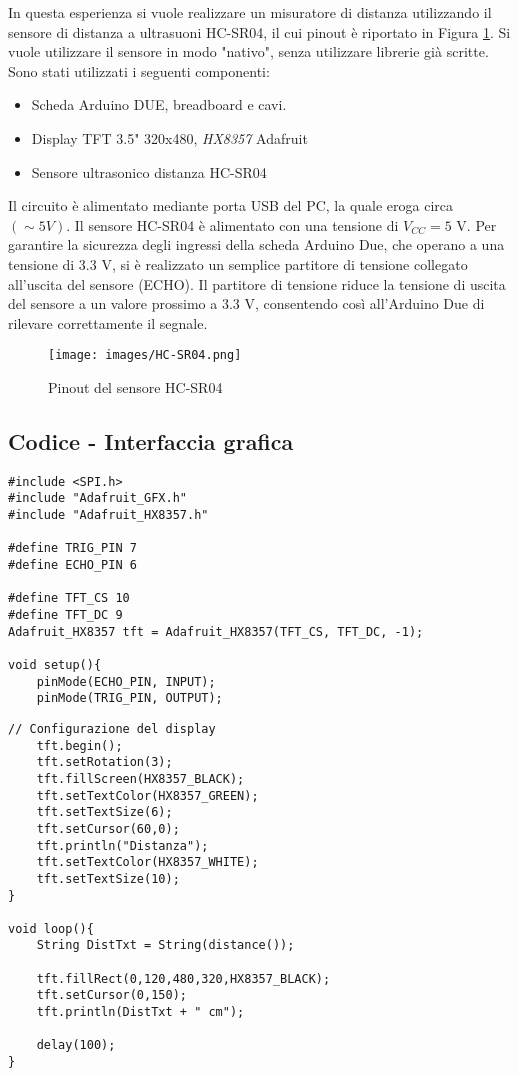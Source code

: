 In questa esperienza si vuole realizzare un misuratore di distanza utilizzando il sensore di distanza a ultrasuoni HC-SR04, il cui pinout è riportato in Figura \ref{fig:HC-SR04}. Si vuole utilizzare il sensore in modo "nativo", senza utilizzare librerie già scritte. Sono stati utilizzati i seguenti componenti:
\begin{itemize}
    \item Scheda Arduino DUE, breadboard e cavi.
    \item Display TFT 3.5" 320x480, \textit{HX8357} Adafruit
    \item Sensore ultrasonico distanza HC-SR04
\end{itemize}
Il circuito è alimentato mediante porta USB del PC, la quale eroga circa $(\sim 5 V)$. Il sensore HC-SR04 è alimentato con una tensione di $V_{CC}=5$ V. Per garantire la sicurezza degli ingressi della scheda Arduino Due, che operano a una tensione di 3.3 V, si è realizzato un semplice partitore di tensione collegato all'uscita del sensore (ECHO). Il partitore di tensione riduce la tensione di uscita del sensore a un valore prossimo a 3.3 V, consentendo così all'Arduino Due di rilevare correttamente il segnale.
\begin{figure}[H]
    \centering
    \texttt{[image: images/HC-SR04.png]}
    \caption{Pinout del sensore HC-SR04}
    \label{fig:HC-SR04}
\end{figure}
\subsection{Codice - Interfaccia grafica}
\begin{lstlisting}[frame=single, language=Arduino]
#include <SPI.h>
#include "Adafruit_GFX.h"
#include "Adafruit_HX8357.h"

#define TRIG_PIN 7
#define ECHO_PIN 6

#define TFT_CS 10
#define TFT_DC 9
Adafruit_HX8357 tft = Adafruit_HX8357(TFT_CS, TFT_DC, -1); 

void setup(){
    pinMode(ECHO_PIN, INPUT);
    pinMode(TRIG_PIN, OUTPUT);
\end{lstlisting}
\begin{lstlisting}[frame=single, language=Arduino]
    // Configurazione del display
    tft.begin();
    tft.setRotation(3);
    tft.fillScreen(HX8357_BLACK);
    tft.setTextColor(HX8357_GREEN);
    tft.setTextSize(6);
    tft.setCursor(60,0);
    tft.println("Distanza");
    tft.setTextColor(HX8357_WHITE);
    tft.setTextSize(10);
}

void loop(){
    String DistTxt = String(distance());
    
    tft.fillRect(0,120,480,320,HX8357_BLACK);
    tft.setCursor(0,150);
    tft.println(DistTxt + " cm");
    
    delay(100);
}
\end{lstlisting}
